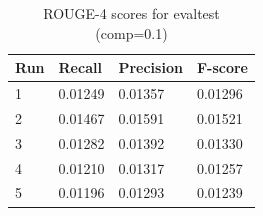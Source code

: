 \documentclass[11pt]{article}
\begin{document}
\begin{table}[!htbp]
\centering
\caption*{ROUGE-4 scores for evaltest (comp=0.1)}
\begin{tabular}{|l|l|l|l|}
\hline
Run   & Recall  & Precision & F-score \\ \hline
1 & 0.01249 & 0.01357   & 0.01296 \\ \hline
2 & 0.01467 & 0.01591   & 0.01521 \\ \hline
3 & 0.01282 & 0.01392   & 0.01330 \\ \hline
4 & 0.01210 & 0.01317   & 0.01257 \\ \hline
5 & 0.01196 & 0.01293   & 0.01239 \\ \hline
\end{tabular}
\end{table}
\end{document}
